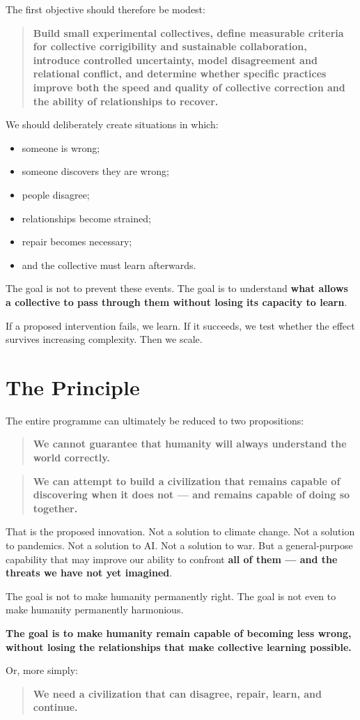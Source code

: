 \documentclass{article}
\begin{document}
The first objective should therefore be modest:
\begin{quote}
    \textbf{Build small experimental collectives, define measurable criteria for collective corrigibility and sustainable collaboration, introduce controlled uncertainty, model disagreement and relational conflict, and determine whether specific practices improve both the speed and quality of collective correction and the ability of relationships to recover.}
\end{quote}

We should deliberately create situations in which:
\begin{itemize}
    \item someone is wrong;
    \item someone discovers they are wrong;
    \item people disagree;
    \item relationships become strained;
    \item repair becomes necessary;
    \item and the collective must learn afterwards.
\end{itemize}

The goal is not to prevent these events. The goal is to understand \textbf{what allows a collective to pass through them without losing its capacity to learn}.

If a proposed intervention fails, we learn. If it succeeds, we test whether the effect survives increasing complexity. Then we scale.

\section{The Principle}
The entire programme can ultimately be reduced to two propositions:
\begin{quote}
    \textbf{We cannot guarantee that humanity will always understand the world correctly.}
\end{quote}
\begin{quote}
    \textbf{We can attempt to build a civilization that remains capable of discovering when it does not — and remains capable of doing so together.}
\end{quote}

That is the proposed innovation. Not a solution to climate change. Not a solution to pandemics. Not a solution to AI. Not a solution to war. But a general-purpose capability that may improve our ability to confront \textbf{all of them — and the threats we have not yet imagined}.

The goal is not to make humanity permanently right. The goal is not even to make humanity permanently harmonious.

\textbf{The goal is to make humanity remain capable of becoming less wrong, without losing the relationships that make collective learning possible.}

Or, more simply:
\begin{quote}
    \textbf{We need a civilization that can disagree, repair, learn, and continue.}
\end{quote}
\end{document}
